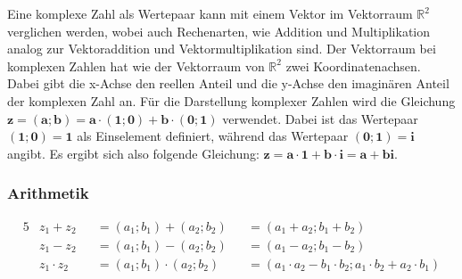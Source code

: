 \parbox{0.9\textwidth}
{
    Eine komplexe Zahl als Wertepaar kann mit einem Vektor im Vektorraum $\mathbb{R}^2$ verglichen werden,
    wobei auch Rechenarten, wie Addition und Multiplikation analog zur Vektoraddition und Vektormultiplikation sind.
    Der Vektorraum bei komplexen Zahlen hat wie der Vektorraum von $\mathbb{R}^2$ zwei Koordinatenachsen.
    Dabei gibt die x-Achse den reellen Anteil und die y-Achse den imaginären Anteil der komplexen Zahl an.
    Für die Darstellung komplexer Zahlen wird die Gleichung 
    $\mathbf{z = \left(a; b\right) = a \cdot \left(1; 0\right) + b \cdot \left(0;1\right)}$ verwendet.
    Dabei ist das Wertepaar $\mathbf{\left(1; 0\right) = 1}$ als Einselement definiert, während das Wertepaar 
    $\mathbf{\left(0; 1\right) = i}$ angibt. Es ergibt sich also folgende Gleichung: 
    $\mathbf{z = a \cdot 1 + b \cdot i = a + bi}$.
}

\subsubsection{Arithmetik}

\begin{alignat*}{5}
    &z_1 + z_2     &&= \left(a_1; b_1\right) + \left(a_2; b_2\right)     &&= \left(a_1 + a_2; b_1 + b_2\right) \\
    &z_1 - z_2     &&= \left(a_1; b_1\right) - \left(a_2; b_2\right)     &&= \left(a_1 - a_2; b_1 - b_2\right) \\
    &z_1 \cdot z_2 &&= \left(a_1; b_1\right) \cdot \left(a_2; b_2\right) &&= \left(a_1 \cdot a_2 - b_1 \cdot b_2; a_1 \cdot b_2 + a_2 \cdot b_1\right)
\end{alignat*}


